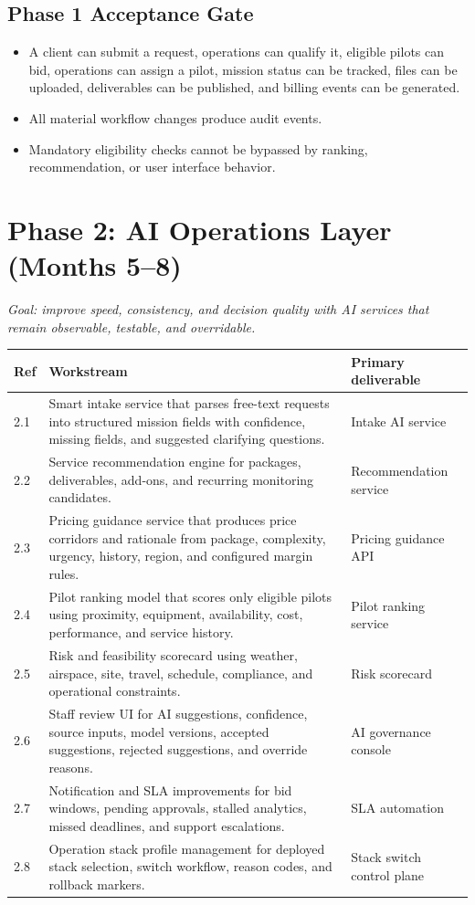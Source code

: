 \documentclass[11pt,a4paper]{article}
\begin{document}
\subsection*{Phase 1 Acceptance Gate}

\begin{itemize}[leftmargin=*]
    \item A client can submit a request, operations can qualify it, eligible pilots can bid, operations can assign a pilot, mission status can be tracked, files can be uploaded, deliverables can be published, and billing events can be generated.
    \item All material workflow changes produce audit events.
    \item Mandatory eligibility checks cannot be bypassed by ranking, recommendation, or user interface behavior.
\end{itemize}

\section{Phase 2: AI Operations Layer (Months 5--8)}

\textit{Goal: improve speed, consistency, and decision quality with AI services that remain observable, testable, and overridable.}

\begin{longtable}{p{}p{}p{}}
\toprule
\textbf{Ref} & \textbf{Workstream} & \textbf{Primary deliverable} \\
\midrule
2.1 & Smart intake service that parses free-text requests into structured mission fields with confidence, missing fields, and suggested clarifying questions. & Intake AI service \\
2.2 & Service recommendation engine for packages, deliverables, add-ons, and recurring monitoring candidates. & Recommendation service \\
2.3 & Pricing guidance service that produces price corridors and rationale from package, complexity, urgency, history, region, and configured margin rules. & Pricing guidance API \\
2.4 & Pilot ranking model that scores only eligible pilots using proximity, equipment, availability, cost, performance, and service history. & Pilot ranking service \\
2.5 & Risk and feasibility scorecard using weather, airspace, site, travel, schedule, compliance, and operational constraints. & Risk scorecard \\
2.6 & Staff review UI for AI suggestions, confidence, source inputs, model versions, accepted suggestions, rejected suggestions, and override reasons. & AI governance console \\
2.7 & Notification and SLA improvements for bid windows, pending approvals, stalled analytics, missed deadlines, and support escalations. & SLA automation \\
2.8 & Operation stack profile management for deployed stack selection, switch workflow, reason codes, and rollback markers. & Stack switch control plane \\
\bottomrule
\end{longtable}
\end{document}

